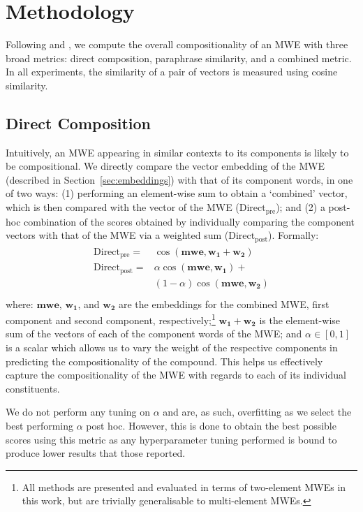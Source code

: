 \documentclass[11pt,a4paper]{article}
\newcommand{\method}[2][]{\ensuremath{\text{#2}_{\text{#1}}}\xspace}
\newcommand{\presum}{\method[pre]{Direct}}
\newcommand{\postsum}{\method[post]{Direct}}
\newcommand{\MWEvec}{\ensuremath{\mathbf{mwe}}\xspace}
\newcommand{\MWEonevec}{\ensuremath{\mathbf{w_1}}\xspace}
\newcommand{\MWEtwovec}{\ensuremath{\mathbf{w_2}}\xspace}
\newcommand{\secref}[2][]{Section#1~\ref{#2}\xspace}
\begin{document}
\section{Methodology}

Following \citet{Salehi2015} and \citet{Nanda2018}, we compute the overall compositionality of an MWE with three broad metrics: direct composition, paraphrase similarity, and a combined metric. In all experiments, the similarity of a pair of vectors is measured using cosine similarity.

\subsection{Direct Composition}
\label{sec:direct}

Intuitively, an MWE appearing in similar contexts to its components is likely to be compositional. We directly compare the vector embedding of the MWE (described in \secref{sec:embeddings}) with that of its component words, in one of two ways: (1) performing an element-wise sum to obtain a `combined' vector, which is then compared with the vector of the MWE (\presum); and (2) a post-hoc combination of the scores obtained by individually comparing the component vectors with that of the MWE via a weighted sum (\postsum). Formally:
\begin{eqnarray*}
  \begin{split}
    \presum = & \cos(\MWEvec, \MWEonevec + \MWEtwovec)\\
    \postsum = & \alpha \cos(\MWEvec, \MWEonevec) + \\  
    & (1 - \alpha) \cos(\MWEvec, \MWEtwovec)\\
  \end{split}
\end{eqnarray*}
where: \MWEvec, \MWEonevec, and \MWEtwovec are the embeddings for the combined MWE, first component and second component, respectively;\footnote{All methods are presented and evaluated in terms of two-element MWEs in this work, but are trivially generalisable to multi-element MWEs.} $\MWEonevec + \MWEtwovec$ is the element-wise sum of the vectors of each of the component words of the MWE; and $\alpha \in [0,1]$ is a scalar which allows us to vary the weight of the respective components in predicting the compositionality of the compound. This helps us effectively capture the compositionality of the MWE with regards to each of its individual constituents.

We do not perform any tuning on $\alpha$ and are, as such, overfitting as we select the best performing $\alpha$ post hoc. However, this is done to obtain the best possible scores using this metric as any hyperparameter tuning performed is bound to produce lower results that those reported.
\end{document}
